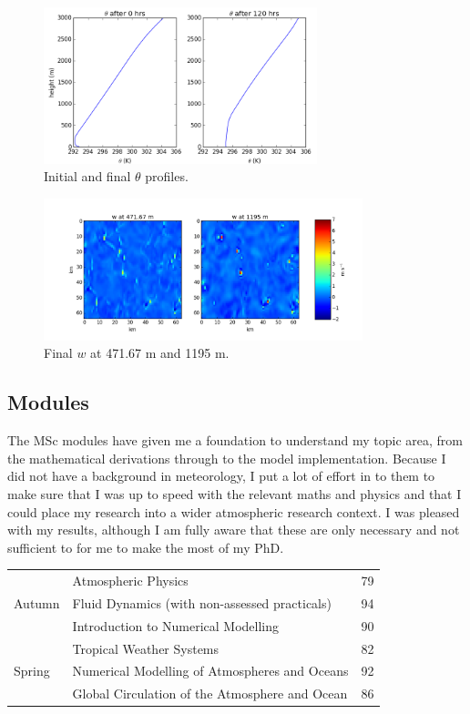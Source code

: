 \documentclass[11pt,a4paper]{article}
\begin{document}
\begin{figure}[hbp!]
    \centering
    \includegraphics[width=300px]{figures/figure_th0_120}
    \caption{Initial and final $\theta$ profiles.}
    \label{fig:th0}
\end{figure}

\begin{figure}[htp!]
    \centering
    \includegraphics[width=350px]{figures/figure_2d}
    \caption{Final $w$ at 471.67 m and 1195 m.}
    \label{fig:w_final_471}
\end{figure}

\newpage
\subsection{Modules}

The MSc modules have given me a foundation to understand my topic area, from the mathematical
derivations through to the model implementation. Because I did not have a background in meteorology,
I put a lot of effort in to them to make sure that I was up to speed with the relevant maths and
physics and that I could place my research into a wider atmospheric research context. I was pleased
with my results, although I am fully aware that these are only necessary and not sufficient to for
me to make the most of my PhD.

\begin{tabular}{ |l|l|l| }
\hline
\multirow{3}{*}{Autumn} & Atmospheric Physics & 79 \\
  & Fluid Dynamics (with non-assessed practicals) & 94 \\
  & Introduction to Numerical Modelling & 90 \\
\hline
\multirow{3}{*}{Spring}   & Tropical Weather Systems & 82 \\
  & Numerical Modelling of Atmospheres and Oceans & 92 \\
  & Global Circulation of the Atmosphere and Ocean & 86 \\
\hline
\end{tabular}
\end{document}
